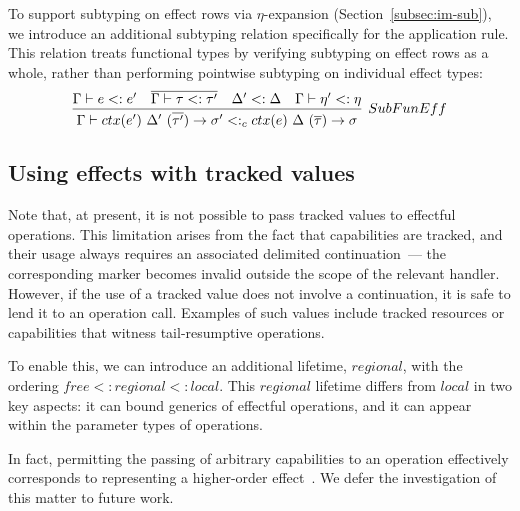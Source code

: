 \documentclass[acmsmall,review,screen]{acmart}
\newcommand{\ctx}[1]{ctx(#1)~}
\begin{document}
To support subtyping on effect rows via $\eta$-expansion (Section~\ref{subsec:im-sub}), we introduce an additional subtyping relation specifically for the application rule.
This relation treats functional types by verifying subtyping on effect rows as a whole, rather than performing pointwise subtyping on individual effect types:
\[
    \infer[SubFunEff]{
        \Gamma\vdash \ctx{e'} \Delta' ~ (\overline{\tau'})\to \sigma' <:_c \ctx{e} \Delta ~ (\overline{\tau})\to \sigma
    }{
        \Gamma\vdash e <: e' & \overline{\Gamma\vdash \tau <: \tau'} & \Delta' <: \Delta & \Gamma\vdash \eta' <: \eta
    }
\]

\subsection{Using effects with tracked values} \label{subsec:relax-tracked}

Note that, at present, it is not possible to pass tracked values to effectful operations.
This limitation arises from the fact that capabilities are tracked, and their usage always requires an associated delimited continuation~--- the corresponding marker becomes invalid outside the scope of the relevant handler.
However, if the use of a tracked value does not involve a continuation, it is safe to lend it to an operation call.
Examples of such values include tracked resources or capabilities that witness tail-resumptive operations. %

To enable this, we can introduce an additional lifetime, $regional$, with the ordering $free <: regional <: local$.
This $regional$ lifetime differs from $local$ in two key aspects: it can bound generics of effectful operations, and it can appear within the parameter types of operations.

In fact, permitting the passing of arbitrary capabilities to an operation effectively corresponds to representing a higher-order effect~\cite{wu2014effect, zhang2020handling, van2022handling}.
We defer the investigation of this matter to future work.





\end{document}
